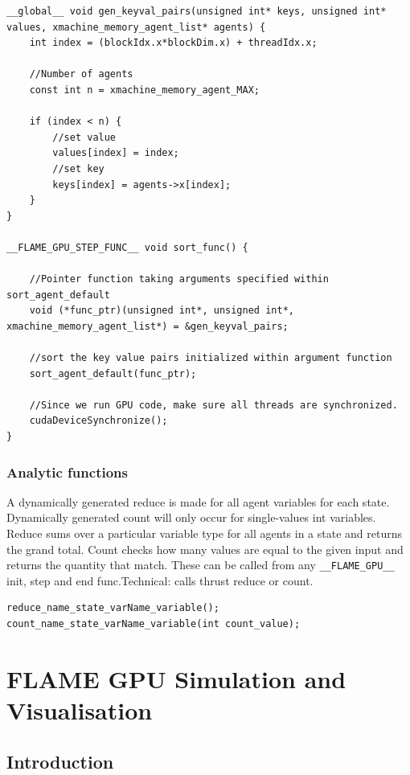 \documentclass[11pt, a4paper, onecolumn, oneside]{report}
\begin{document}
\begin{lstlisting}[language=C_]
__global__ void gen_keyval_pairs(unsigned int* keys, unsigned int* values, xmachine_memory_agent_list* agents) {
	int index = (blockIdx.x*blockDim.x) + threadIdx.x;

	//Number of agents
	const int n = xmachine_memory_agent_MAX;

	if (index < n) {
		//set value
		values[index] = index;
		//set key
		keys[index] = agents->x[index];
	}
}

__FLAME_GPU_STEP_FUNC__ void sort_func() {
	
	//Pointer function taking arguments specified within sort_agent_default
	void (*func_ptr)(unsigned int*, unsigned int*, xmachine_memory_agent_list*) = &gen_keyval_pairs;
    
	//sort the key value pairs initialized within argument function
	sort_agent_default(func_ptr);
	
    //Since we run GPU code, make sure all threads are synchronized.
	cudaDeviceSynchronize();
}
\end{lstlisting}

\subsection{Analytic functions}
A dynamically generated reduce is made for all agent variables for each state. Dynamically generated count will only occur for single-values int variables. Reduce sums over a particular variable type for all agents in a state and returns the grand total. Count checks how many values are equal to the given input and returns the quantity that match. These can be called from any \verb|__FLAME_GPU__| init, step and end func.Technical: calls thrust reduce or count. 

\begin{lstlisting}[language=C_]
reduce_name_state_varName_variable();
count_name_state_varName_variable(int count_value);
\end{lstlisting}



\chapter{FLAME GPU Simulation and Visualisation}
\label{ch:4}
\section{Introduction}
\label{sec:41}
\end{document}
